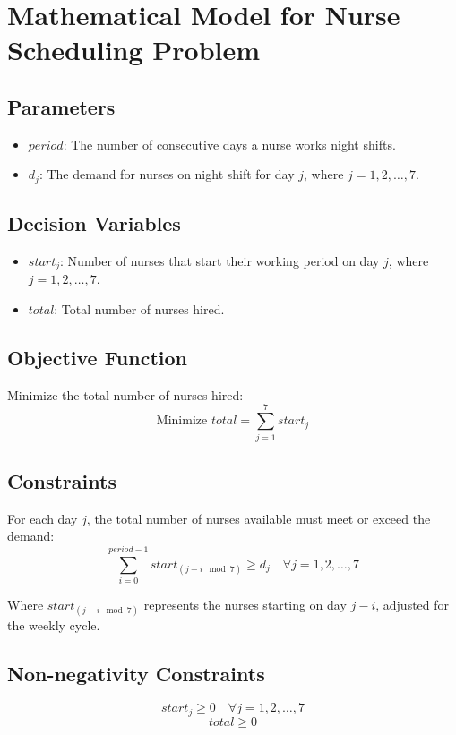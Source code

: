 \documentclass{article}
\begin{document}
\section*{Mathematical Model for Nurse Scheduling Problem}

\subsection*{Parameters}
\begin{itemize}
    \item $period$: The number of consecutive days a nurse works night shifts.
    \item $d_j$: The demand for nurses on night shift for day $j$, where $j = 1, 2, \ldots, 7$.
\end{itemize}

\subsection*{Decision Variables}
\begin{itemize}
    \item $start_j$: Number of nurses that start their working period on day $j$, where $j = 1, 2, \ldots, 7$.
    \item $total$: Total number of nurses hired.
\end{itemize}

\subsection*{Objective Function}
Minimize the total number of nurses hired:
\[
\text{Minimize } total = \sum_{j=1}^{7} start_j
\]

\subsection*{Constraints}
For each day $j$, the total number of nurses available must meet or exceed the demand:
\[
\sum_{i=0}^{period-1} start_{(j-i \mod 7)} \geq d_j \quad \forall j = 1, 2, \ldots, 7
\]

Where $start_{(j-i \mod 7)}$ represents the nurses starting on day $j-i$, adjusted for the weekly cycle.

\subsection*{Non-negativity Constraints}
\[
start_j \geq 0 \quad \forall j = 1, 2, \ldots, 7
\]
\[
total \geq 0
\]
\end{document}
